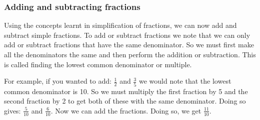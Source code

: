             \subsubsection{ Adding and subtracting fractions}
            \nopagebreak
            \label{m39392*eip-107}Using the concepts learnt in simplification of fractions, we can now add and subtract simple fractions. To add or subtract fractions we note that we can only add or subtract fractions that have the same denominator. So we must first make all the denominators the same and then perform the addition or subtraction. This is called finding the lowest common denominator or multiple. 
\par \label{m39392*eip-997}For example, if you wanted to add: $\frac{1}{2}$ and $\frac{3}{5}$ we would note that the lowest common denominator is 10. So we must multiply the first fraction by 5 and the second fraction by 2 to get both of these with the same denominator. Doing so gives: $\frac{5}{10}$ and $\frac{6}{10}$. Now we can add the fractions. Doing so, we get $\frac{11}{10}$.\par \label{m39392*eip-337}\vspace{.5cm} 
      \noindent
